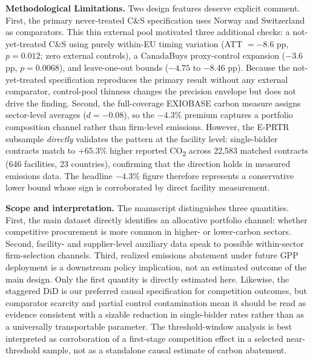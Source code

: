 \documentclass[11pt,a4paper]{article}
\begin{document}
\textbf{Methodological Limitations.} Two design features deserve explicit comment. First, the primary never-treated C\&S specification uses Norway and Switzerland as comparators. This thin external pool motivated three additional checks: a not-yet-treated C\&S using purely within-EU timing variation (ATT $= -8.6$ pp, $p = 0.012$; zero external controls), a CanadaBuys proxy-control expansion ($-3.6$ pp, $p = 0.0068$), and leave-one-out bounds ($-4.75$ to $-8.46$ pp). Because the not-yet-treated specification reproduces the primary result without any external comparator, control-pool thinness changes the precision envelope but does not drive the finding. Second, the full-coverage EXIOBASE carbon measure assigns sector-level averages ($d = -0.08$), so the $-4.3\%$ premium captures a portfolio composition channel rather than firm-level emissions. However, the E-PRTR subsample \textit{directly} validates the pattern at the facility level: single-bidder contracts match to $+65.3\%$ higher reported CO\textsubscript{2} across 22,583 matched contracts (646 facilities, 23 countries), confirming that the direction holds in measured emissions data. The headline $-4.3\%$ figure therefore represents a conservative lower bound whose sign is corroborated by direct facility measurement.

\textbf{Scope and interpretation.} The manuscript distinguishes three quantities. First, the main dataset directly identifies an allocative portfolio channel: whether competitive procurement is more common in higher- or lower-carbon sectors. Second, facility- and supplier-level auxiliary data speak to possible within-sector firm-selection channels. Third, realized emissions abatement under future GPP deployment is a downstream policy implication, not an estimated outcome of the main design. Only the first quantity is directly estimated here. Likewise, the staggered DiD is our preferred causal specification for competition outcomes, but comparator scarcity and partial control contamination mean it should be read as evidence consistent with a sizable reduction in single-bidder rates rather than as a universally transportable parameter. The threshold-window analysis is best interpreted as corroboration of a first-stage competition effect in a selected near-threshold sample, not as a standalone causal estimate of carbon abatement.
\end{document}
